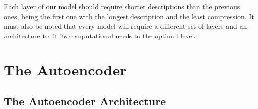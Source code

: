 Each layer of our model should require shorter descriptions than the previous ones, being the first one with the longest description and the least compression. It must also be noted that every model will require a different set of layers and an architecture to fit its computational needs to the optimal level. \par

\section{The Autoencoder}

\subsection{The Autoencoder Architecture}

